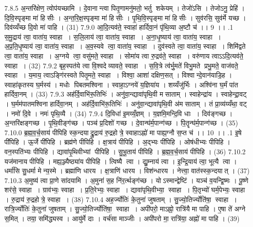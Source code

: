 7.8.5
अ॒न्तरि॑क्षेण॒ त्वोप॑यच्छामि । दे॒वानान्त्वा पितृ॒णामनु॑मतो॒ भर्तु शकेयम् । तेजो॑ऽसि । तेजोऽनु॒ प्रेहि॑ । दि॒वि॒स्पृङ्मा मा॑ हिसीः । अ॒न्त॒रि॒क्ष॒स्पृङ्मा मा॑ हिसीः । पृ॒थि॒वि॒स्पृङ्मा मा॑ हिसीः । सुव॑रसि॒ सुव॑र्मे यच्छ । दिव॑य्यँच्छ दि॒वो मा॑ पाहि । (31)
7.9.0
आ॒दि॒त्यव॑ते॒ स्वाहा॑ हार्दिवा॒नं पृ॑थि॒व्या अ॒ष्टौ च॑ ।। 9 ।।
.1
स॒मु॒द्राय॑ त्वा॒ वाता॑य॒ स्वाहा । स॒लि॒लाय॑ त्वा॒ वाता॑य॒ स्वाहा । अ॒ना॒धृ॒ष्याय॑ त्वा॒ वाता॑य॒ स्वाहा । अ॒प्र॒ति॒धृ॒ष्याय॑ त्वा॒ वाता॑य॒ स्वाहा । अ॒व॒स्यवे त्वा॒ वाता॑य॒ स्वाहा । दुव॑स्वते त्वा॒ वाता॑य॒ स्वाहा । शिमि॑द्वते त्वा॒ वाता॑य॒ स्वाहा । अ॒ग्नये त्वा॒ वसु॑मते॒ स्वाहा । सोमा॑य त्वा रु॒द्रव॑ते॒ स्वाहा । वरु॑णाय त्वाऽऽदि॒त्यव॑ते॒ स्वाहा । (32)
7.9.2
बृह॒स्पत॑ये त्वा वि॒श्वदेव्यावते॒ स्वाहा । स॒वि॒त्रे त्व॑र्भु॒मते॑ विभु॒मते प्रभु॒मते॒ वाज॑वते॒ स्वाहा । य॒माय॒ त्वाऽङ्गि॑रस्वते पितृ॒मते॒ स्वाहा । विश्वा॒ आशा॑ दक्षिण॒सत् । विश्वान्दे॒वान॑याडि॒ह । स्वाहा॑कृतस्य घ॒र्मस्य॑ । मधोः पिबतमश्विना । स्वाहा॒ऽग्नये॑ य॒ज्ञिया॑य । शय्यँजु॑र्भिः । अश्वि॑ना घ॒र्मं पा॑त हार्दिवा॒नम् । (33)
7.9.3
अह॑र्दि॒वाभि॑रू॒तिभिः॑ । अनु॑वा॒न्द्यावा॑पृथि॒वी मसाताम् । स्वाहेन्द्रा॑य । स्वाहेन्द्रा॒वट् । घ॒र्मम॑पातमश्विना हार्दिवा॒नम् । अह॑र्दि॒वाभि॑रू॒तिभिः॑ । अनु॑वा॒न्द्यावा॑पृथि॒वी अ॑मसाताम् । तं प्रा॒व्य॑य्यँथा॒ वट् । नमो॑ दि॒वे । नमः॑ पृथि॒व्यै । (34)
7.9.4
दि॒विधा॑ इ॒मय्यँ॒ज्ञम् । य॒ज्ञमि॒मन्दि॒वि धाः । दिव॑ङ्गच्छ । अ॒न्तरि॑क्षङ्गच्छ । पृ॒थि॒वीङ्ग॑च्छ । पञ्च॑ प्र॒दिशो॑ गच्छ । दे॒वान्घ॑र्म॒पान्ग॑च्छ । पि॒तॄन्घ॑र्म॒पान्ग॑च्छ । (35)
7.10.0
ब्र॒ह्म॒व॒र्च॒साय॑ पीपिहि स्क॒न्दयाद्रु॒द्राय॑ रु॒द्रहोत्रे॒ स्वाहाऽह्नो॑ मा पाह्य॒ग्नौ स॒प्त च॑ ।। 10 ।।
.1
इ॒षे पी॑पिहि । ऊ॒र्जे पी॑पिहि । ब्रह्म॑णे पीपिहि । क्ष॒त्राय॑ पीपिहि । अ॒द्भ्यः पी॑पिहि । ओष॑धीभ्यः पीपिहि । वन॒स्पति॑भ्यः पीपिहि । द्यावा॑पृ॒थिवीभ्यां पीपिहि । सु॒भू॒ताय॑ पीपिहि । ब्र॒ह्म॒व॒र्च॒साय॑ पीपिहि । (36)
7.10.2
यज॑मानाय पीपिहि । मह्य॒ञ्ज्यैष्ठ्या॑य पीपिहि । त्विष्यै त्वा । द्यु॒म्नाय॑ त्वा । इ॒न्द्रि॒याय॑ त्वा॒ भूत्यै त्वा । धर्मा॑सि सु॒धर्मा मेन्य॒स्मे । ब्रह्मा॑णि धारय । क्ष॒त्राणि॑ धारय । विश॑न्धारय । नेत्त्वा॒ वात॑स्स्क॒न्दयात् । (37)
7.10.3
अ॒मुष्य॑ त्वा प्रा॒णे सा॑दयामि । अ॒मुना॑ स॒ह नि॑र॒र्त्थङ्ग॑च्छ । योऽस्मान्द्वेष्टि॑ । यञ्च॑ व॒यन्द्वि॒ष्मः । पू॒ष्णे शर॑से॒ स्वाहा । ग्राव॑भ्यः॒ स्वाहा । प्र॒ति॒रेभ्यः॒ स्वाहा । द्यावा॑पृथि॒वीभ्या॒ स्वाहा । पि॒तृभ्यो॑ घर्म॒पेभ्यः॒ स्वाहा । रु॒द्राय॑ रु॒द्रहोत्रे॒ स्वाहा । (38)
7.10.4
अह॒र्ज्योतिः॑ के॒तुना॑ जुषताम् । सु॒ज्यो॒तिर्ज्योति॑षा॒ स्वाहा । रात्रि॒र्ज्योतिः॑ के॒तुना॑ जुषताम् । सु॒ज्यो॒तिर्ज्योति॑षा॒ स्वाहा । अपी॑परो॒ माऽह्नो॒ रात्रि॑यै मा पाहि । ए॒षा ते॑ अग्ने स॒मित् । तया॒ समि॑द्ध्यस्व । आयु॑र्मे दाः । वर्च॑सा माञ्जीः । अपी॑परो मा॒ रात्रि॑या॒ अह्नो॑ मा पाहि । (39)

